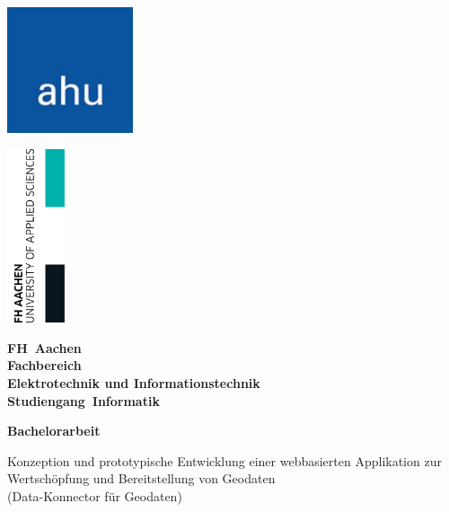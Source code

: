 \documentclass[a4paper,12pt]{scrreprt}
\begin{document}
\begin{titlepage}
	\thispagestyle{empty}

    \noindent
    \begin{minipage}[t]{0.5\textwidth}
        \includegraphics[width=3.7cm]{firmenlogo.jpg}
    \end{minipage}%
    \begin{minipage}[t]{0.5\textwidth}
          \raggedleft
          \includegraphics[width=1.7cm]{FHAC.jpg}
    \end{minipage}

	\vspace{1.0cm}

	{\centering \bfseries \Large FH~Aachen \\
	\vspace{1cm}
	\normalsize Fachbereich\\
	Elektrotechnik und Informationstechnik \\
	Studiengang~Informatik \par}

	\vspace{1cm}
    
	{\centering \bfseries \large Bachelorarbeit \par}

	\vspace{1cm}

	\centering \begin{minipage}[t]{13cm}
		\centering \small Konzeption und prototypische Entwicklung einer webbasierten Applikation zur Wertschöpfung und Bereitstellung von Geodaten \\
        (Data-Konnector für Geodaten)
		\medskip
	\end{minipage}


\end{titlepage}
\end{document}
